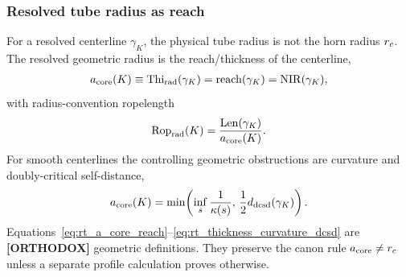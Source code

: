 \subsubsection{Resolved tube radius as reach}
For a resolved centerline $\gamma_K$, the physical tube radius is not the horn
radius $r_c$.  The resolved geometric radius is the reach/thickness of the
centerline,
\begin{align}
    a_{\rm core}(K)
    \equiv
    \operatorname{Thi}_{\rm rad}(\gamma_K)
    =
    \operatorname{reach}(\gamma_K)
    =
    \operatorname{NIR}(\gamma_K),
    \label{eq:rt_a_core_reach}
\end{align}
with radius-convention ropelength
\begin{align}
    \operatorname{Rop}_{\rm rad}(K)
    =
    \frac{\operatorname{Len}(\gamma_K)}{a_{\rm core}(K)}.
    \label{eq:rt_rop_radius_convention}
\end{align}
For smooth centerlines the controlling geometric obstructions are curvature
and doubly-critical self-distance,
\begin{align}
    a_{\rm core}(K)
    =
    \min\!\left(
        \inf_s\frac{1}{\kappa(s)},\,
        \frac12 d_{\rm dcsd}(\gamma_K)
    \right).
    \label{eq:rt_thickness_curvature_dcsd}
\end{align}
Equations~\eqref{eq:rt_a_core_reach}--\eqref{eq:rt_thickness_curvature_dcsd}
are \textbf{[ORTHODOX]} geometric definitions.  They preserve the canon rule
$a_{\rm core}\neq r_c$ unless a separate profile calculation proves otherwise.

